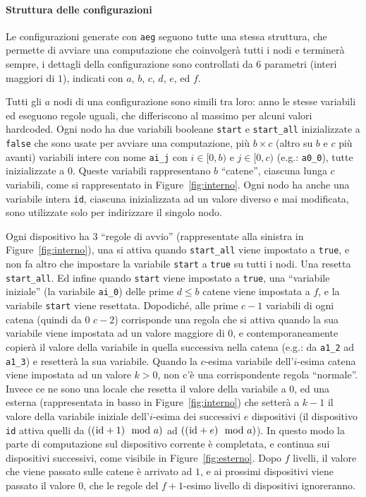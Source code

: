 \documentclass[12pt, a4paper]{article}
\newcommand{\aeg}[0]{{\lstinline{aeg}}\xspace}
\begin{document}
\paragraph{Struttura delle configurazioni}

Le configurazioni generate con \aeg seguono tutte una stessa struttura, che permette di avviare una computazione che coinvolgerà tutti i nodi e terminerà sempre, i dettagli della configurazione sono controllati da $6$ parametri (interi maggiori di $1$), indicati con $a$, $b$, $c$, $d$, $e$, ed $f$.

Tutti gli $a$ nodi di una configurazione sono simili tra loro: anno le stesse variabili ed eseguono regole uguali, che differiscono al massimo per alcuni valori hardcoded. Ogni nodo ha due variabili booleane \lstinline{start} e \lstinline{start_all} inizializzate a \lstinline{false} che sono usate per avviare una computazione, più $b\times c$ (altro su $b$ e $c$ più avanti) variabili intere con nome \lstinline{ai_j} con $i\in [0,b)$ e $j\in [0,c)$ (e.g.: \lstinline{a0_0}), tutte inizializzate a $0$. Queste variabili rappresentano $b$ ``catene'', ciascuna lunga $c$ variabili, come si rappresentato in Figure~\ref{fig:interno}. Ogni nodo ha anche una variabile intera \lstinline{id}, ciascuna inizializzata ad un valore diverso e mai modificata, sono utilizzate solo per indirizzare il singolo nodo.

Ogni dispositivo ha 3 ``regole di avvio'' (rappresentate alla sinistra in Figure~\ref{fig:interno}), una si attiva quando \lstinline{start_all} viene impostato a \lstinline{true}, e non fa altro che impostare la variabile \lstinline{start} a \lstinline{true} su tutti i nodi. Una resetta \lstinline{start_all}. Ed infine quando \lstinline{start} viene impostato a \lstinline{true}, una ``variabile iniziale'' (la variabile \lstinline{ai_0}) delle prime $d\leq b$ catene viene impostata a $f$, e la variabile \lstinline{start} viene resettata.
Dopodiché, alle prime $c-1$ variabili di ogni catena (quindi da $0$ $c-2$) corrisponde una regola che si attiva quando la sua variabile viene impostata ad un valore maggiore di $0$, e contemporaneamente copierà il valore della variabile in quella successiva nella catena (e.g.: da \lstinline{a1_2} ad \lstinline{a1_3}) e resetterà la sua variabile.
Quando la $c$-esima variabile dell'$i$-esima catena viene impostata ad un valore $k>0$, non c'è una corrispondente regola ``normale''. Invece ce ne sono una locale che resetta il valore della variabile a $0$, ed una esterna (rappresentata in basso in Figure~\ref{fig:interno}) che setterà a $k-1$ il valore della variabile iniziale dell'$i$-esima dei successivi $e$ dispositivi (il dispositivo \lstinline{id} attiva quelli da $((\text{\lstinline{id}}+1)\mod a)$ ad $((\text{\lstinline{id}}+e)\mod a)$). In questo modo la parte di computazione sul dispositivo corrente è completata, e continua sui dispositivi successivi, come visibile in Figure~\ref{fig:esterno}.
Dopo $f$ livelli, il valore che viene passato sulle catene è arrivato ad $1$, e ai prossimi dispositivi viene passato il valore $0$, che le regole del $f+1$-esimo livello di dispositivi ignoreranno.
\end{document}
